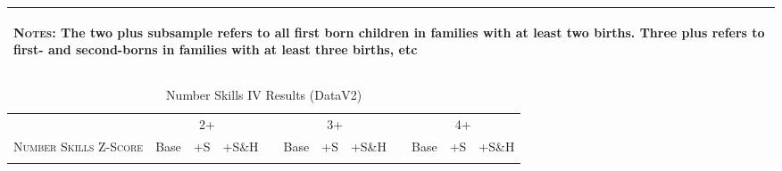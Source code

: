 \begin{landscape}
\begin{table}[htpb!]
\begin{center}
\begin{tabular}{lcccp{2mm}cccp{2mm}ccc}
\midrule\multicolumn{12}{p{19.2cm}}{\begin{footnotesize}\textsc{Notes:} The two plus subsample refers to all first born children in families with at least two births.  Three plus refers to first- and second-borns in families with at least three births, etc\end{footnotesize}} \\ \bottomrule 
\end{tabular}\end{center}\end{table}\end{landscape}\begin{landscape}\begin{table}[htpb!]\caption{Number Skills IV Results (DataV2)}
\label{TWINtab:IVAll}
\begin{center}\begin{tabular}{lcccp{2mm}cccp{2mm}ccc}
\toprule \toprule 
&\multicolumn{3}{c}{2+}&&\multicolumn{3}{c}{3+}&&\multicolumn{3}{c}{4+}\\ \cmidrule(r){2-4} \cmidrule(r){6-8} \cmidrule(r){10-12} 
\textsc{Number Skills Z-Score}&Base&+S&+S\&H&&Base&+S&+S\&H&&Base&+S&+S\&H\\ \midrule 
\begin{footnotesize}\end{footnotesize}& 
\begin{footnotesize}\end{footnotesize}& 
\begin{footnotesize}\end{footnotesize}& 
\begin{footnotesize}\end{footnotesize}& 
\begin{footnotesize}\end{footnotesize}& 
\begin{footnotesize}\end{footnotesize}& 
\begin{footnotesize}\end{footnotesize}& 
\begin{footnotesize}\end{footnotesize}& 
\begin{footnotesize}\end{footnotesize}& 
\begin{footnotesize}\end{footnotesize}& 
\begin{footnotesize}\end{footnotesize}& 
\begin{footnotesize}\end{footnotesize}\\ 

\end{tabular}
\end{center}
\end{table}
\end{landscape}

